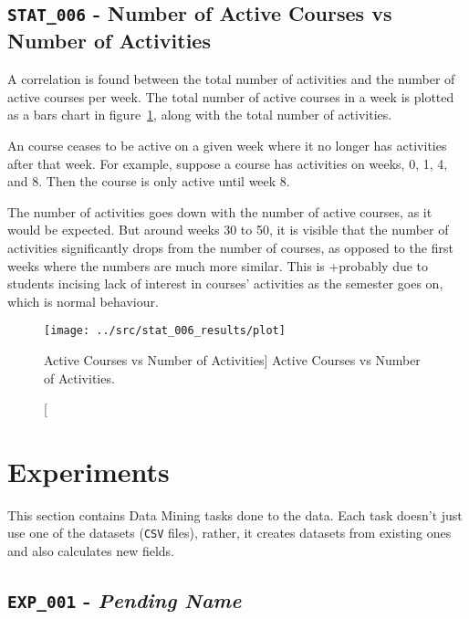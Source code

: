 \subsection{\texttt{STAT\_006} - Number of Active Courses vs Number of
Activities}
\label{sec:stat_006}

A correlation is found between the total number of activities and the number of
active courses per week. The total number of active courses in a week is
plotted as a bars chart in figure~\ref{fig:stat_006}, along with the total
number of activities.

An course ceases to be active on a given week where it no longer has activities
after that week. For example, suppose a course has activities on weeks, 0, 1,
4, and 8. Then the course is only active until week 8.

The number of activities goes down with the number of active courses, as it
would be expected. But around weeks 30 to 50, it is visible that the number of
activities significantly drops from the number of courses, as opposed to the
first weeks where the numbers are much more similar. This is +probably due to
students incising lack of interest in courses' activities as the semester goes
on, which is normal behaviour.

\begin{figure}[h!]
    \centering

    \texttt{[image: ../src/stat\_006\_results/plot]}

    \caption
        [Active Courses vs Number of Activities]
        {Active Courses vs Number of Activities.}

    \label{fig:stat_006}
\end{figure}

\section{Experiments}

This section contains Data Mining tasks done to the data. Each task doesn't
just use one of the datasets (\texttt{CSV} files), rather, it creates datasets
from existing ones and also calculates new fields.

\subsection{\texttt{EXP\_001} - \textit{Pending Name}}

